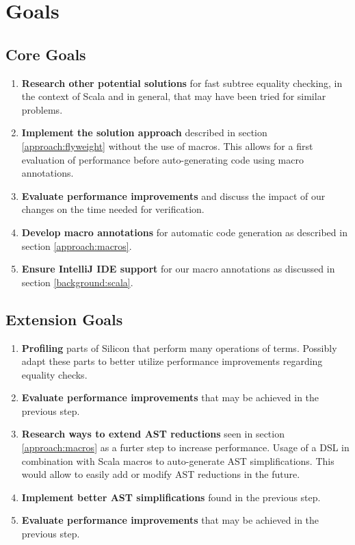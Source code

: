 \documentclass[11pt]{article}
\begin{document}
    \section{Goals}
    \subsection{Core Goals}
    \begin{enumerate}
        \item \textbf{Research other potential solutions} for fast subtree equality checking, in the context of Scala
        and in general, that may have been tried for similar problems.
        \item \textbf{Implement the solution approach} described in section
        \ref{approach:flyweight} without the use of macros. This allows for a first
        evaluation of performance before auto-generating code using macro
        annotations.
        \item \textbf{Evaluate performance improvements} and discuss
        the impact of our changes on the time needed for verification.
        \item \textbf{Develop macro annotations} for automatic code generation as
        described in section \ref{approach:macros}.
        \item \textbf{Ensure IntelliJ IDE support} for our macro annotations as
        discussed in section \ref{background:scala}.
    \end{enumerate}
    \subsection{Extension Goals}
    \begin{enumerate}
        \item \textbf{Profiling} parts of Silicon that perform many operations of
        terms. Possibly adapt these parts to better utilize performance improvements
        regarding equality checks.
        \item \textbf{Evaluate performance improvements} that may be
        achieved in the previous step.
        \item \textbf{Research ways to extend AST reductions} seen in section
        \ref{approach:macros} as a furter step to increase performance.
        Usage of a DSL in combination with Scala macros to auto-generate AST
        simplifications. This would allow to easily add or modify
        AST reductions in the future.
        \item \textbf{Implement better AST simplifications} found in the previous step.
        \item \textbf{Evaluate performance improvements} that may be
        achieved in the previous step.

    \end{enumerate}

    \printbibliography
    
\end{document}
